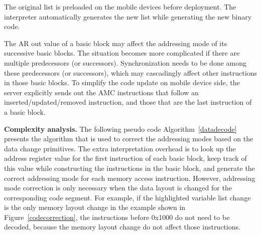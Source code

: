 The original list is preloaded on the mobile devices before deployment. The interpreter automatically generates the new list while generating the new binary code. 

The AR out value of a basic block may affect the addressing mode of its successive basic blocks. The situation becomes more complicated if there are multiple predecessors (or successors). Synchronization needs to be done among these predecessors (or successors), which may cascadingly affect other instructions in those basic blocks. To simplify the code update on mobile device side, the server explicitly sends out the AMC instructions that follow an inserted/updated/removed instruction, and those that are the last instruction of a basic block.

{\bf Complexity analysis.}
The following pseudo code Algorithm~\ref{datadecode} presents the algorithm that is used to correct the addressing modes based on the data change primitives. The extra interpretation overhead is to look up the address register value for the first instruction of each basic block, keep track of this value while constructing the instructions in the basic block, and generate the correct addressing mode for each memory access instruction. However, addressing mode correction is only necessary 
when the data layout is changed for the corresponding code segment. For example, if the highlighted variable list change is the only memory layout change in the example shown in Figure~\ref{codecorrection}, the instructions before 0x1000 do not need to be decoded, because the memory layout change do not affect those instructions.



